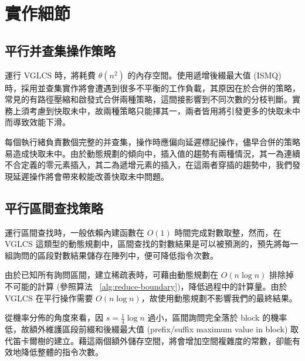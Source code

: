 \section{實作細節}
\label{sec:Implementation}

\subsection{平行并查集操作策略}

運行 VGLCS 時，將耗費 $\theta(n^2)$ 的內存空間。使用遞增後綴最大值 (ISMQ) 時，採用並查集實作將會遭遇到很多不平衡的工作負載，其原因在於合併的策略，常見的有路徑壓縮和啟發式合併兩種策略，這間接影響到不同次數的分枝判斷。實務上須考慮到快取未中，故兩種策略只能擇其一，兩者皆用將引發更多的快取未中而導致效能下滑。

每個執行緒負責數個完整的并查集，操作時應偏向延遲標記操作，儘早合併的策略易造成快取未中。由於動態規劃的傾向中，插入值的趨勢有兩種情況，其一為連續不合定義的零元素插入，其二為遞增元素的插入，在這兩者穿插的趨勢中，我們發現延遲操作將會帶來較能改善快取未中問題。

\subsection{平行區間查找策略}

運行區間查找時，一般依賴內建函數在 $O(1)$ 時間完成對數取整，然而，在 VGLCS 這類型的動態規劃中，區間查找的對數結果是可以被預測的，預先將每一組詢問的區段對數結果儲存在陣列中，便可降低指令次數。

由於已知所有詢問區間，建立稀疏表時，可藉由動態規劃在 $O(n \log n)$ 排除掉不可能的計算 (參照算法 ~\ref{alg:reduce-boundary})，降低過程中的計算量。由於 VGLCS 在平行操作需要 $O(n \log n)$，故使用動態規劃不影響我們的最終結果。



從機率分佈的角度來看，因 $s = \frac{1}{4} \log n$ 過小，區間詢問完全落於 block 的機率低，故額外維護區段前綴和後綴最大值 (prefix/suffix maximum value in block) 取代笛卡爾樹的建立。藉這兩個額外儲存空間，將會增加空間複雜度的常數，卻能有效地降低整體的指令次數。